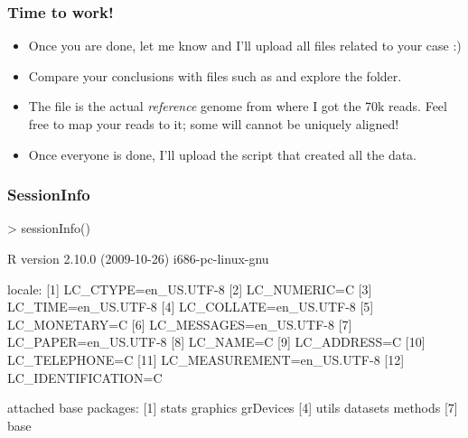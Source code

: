 \begin{frame}[allowframebreaks]
  \frametitle{Time to work!}
  \begin{itemize}
  \item Once you are done, let me know and I'll upload all files related to your case :)
  \item Compare your conclusions with files such as  and explore the  folder.
  \item The  file is the actual \emph{reference} genome from where I got the 70k reads. Feel free to map your reads to it; some will cannot be uniquely aligned!
  \item Once everyone is done, I'll upload the  script that created all the data.
  \end{itemize}
\end{frame}

\begin{frame}
  \frametitle{SessionInfo} \scriptsize
\begin{Schunk}
\begin{Sinput}
> sessionInfo()
\end{Sinput}
\begin{Soutput}
R version 2.10.0 (2009-10-26) 
i686-pc-linux-gnu 

locale:
 [1] LC_CTYPE=en_US.UTF-8      
 [2] LC_NUMERIC=C              
 [3] LC_TIME=en_US.UTF-8       
 [4] LC_COLLATE=en_US.UTF-8    
 [5] LC_MONETARY=C             
 [6] LC_MESSAGES=en_US.UTF-8   
 [7] LC_PAPER=en_US.UTF-8      
 [8] LC_NAME=C                 
 [9] LC_ADDRESS=C              
[10] LC_TELEPHONE=C            
[11] LC_MEASUREMENT=en_US.UTF-8
[12] LC_IDENTIFICATION=C       

attached base packages:
[1] stats     graphics  grDevices
[4] utils     datasets  methods  
[7] base     
\end{Soutput}
\end{Schunk}
\end{frame}



